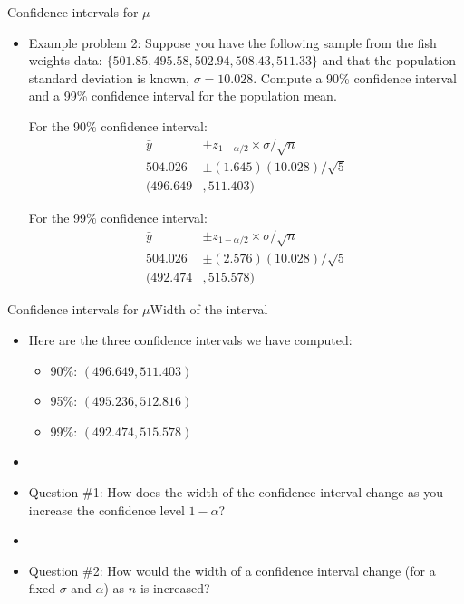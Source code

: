 \documentclass[xcolor=dvipsnames]{beamer}
\begin{document}
\begin{frame}{Confidence intervals for $\mu$}
	\begin{itemize}
		\item Example problem 2: Suppose you have the following sample from the fish weights data: $\{501.85, 495.58, 502.94, 508.43, 511.33 \}$ and that the population standard deviation is known, $\sigma = 10.028$. Compute a 90\% confidence interval and a 99\% confidence interval for the population mean.\\  \vspace{8pt}
		
		For the 90\% confidence interval: 
		\begin{align*}
			\bar{y} &\pm z_{1-\alpha / 2} \times \sigma / \sqrt{n} \\
			504.026 &\pm (1.645)(10.028)/\sqrt{5} \\
			(496.649&, 511.403)
		\end{align*}
		
		For the 99\% confidence interval: 
		\begin{align*}
		\bar{y} &\pm z_{1-\alpha / 2} \times \sigma / \sqrt{n} \\
		504.026 &\pm (2.576)(10.028)/\sqrt{5} \\
		(492.474&, 515.578)
		\end{align*}
		
	\end{itemize}
\end{frame}

\begin{frame}{Confidence intervals for $\mu$}{Width of the interval}
	\begin{itemize}
		\item Here are the three confidence intervals we have computed:
		\begin{itemize}
			\item 90\%: $(496.649, 511.403)$
			\item 95\%: $(495.236, 512.816)$
			\item 99\%: $(492.474, 515.578)$
		\end{itemize}
	\item[]
	\item Question \#1: How does the width of the confidence interval change as you increase the confidence level $1-\alpha$?
	\item[]
	\item Question \#2: How would the width of a confidence interval change (for a fixed $\sigma$ and $\alpha$) as $n$ is increased?
	\end{itemize}
\end{frame}
\end{document}
